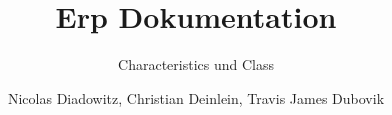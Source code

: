 \newpage
\ClearWallPaper
\title{\Huge\color{grey}Erp Dokumentation}
\subtitle{\large\color{grey}Characteristics und Class}
\author{\small Nicolas Diadowitz, Christian Deinlein, Travis James Dubovik}
\date{}
\color{darkgrey}
\maketitle
